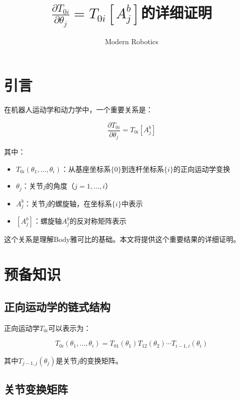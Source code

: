 \documentclass[12pt,a4paper]{article}
\title{$\frac{\partial T_{0i}}{\partial \theta_j} = T_{0i} [A_j^b]$的详细证明}
\author{Modern Robotics}
\date{}
\begin{document}
\maketitle

\tableofcontents
\newpage

\section{引言}

在机器人运动学和动力学中，一个重要关系是：

\begin{equation}
\frac{\partial T_{0i}}{\partial \theta_j} = T_{0i} [A_j^b]
\label{eq:main_relation}
\end{equation}

其中：
\begin{itemize}
\item $T_{0i}(\theta_1, \ldots, \theta_i)$：从基座坐标系$\{0\}$到连杆坐标系$\{i\}$的正向运动学变换
\item $\theta_j$：关节$j$的角度（$j = 1, \ldots, i$）
\item $A_j^b$：关节$j$的螺旋轴，在坐标系$\{i\}$中表示
\item $[A_j^b]$：螺旋轴$A_j^b$的反对称矩阵表示
\end{itemize}

这个关系是理解Body雅可比的基础。本文将提供这个重要结果的详细证明。

\section{预备知识}

\subsection{正向运动学的链式结构}

正向运动学$T_{0i}$可以表示为：

\begin{equation}
T_{0i}(\theta_1, \ldots, \theta_i) = T_{01}(\theta_1) T_{12}(\theta_2) \cdots T_{i-1,i}(\theta_i)
\label{eq:forward_kinematics_chain}
\end{equation}

其中$T_{j-1,j}(\theta_j)$是关节$j$的变换矩阵。

\subsection{关节变换矩阵}
\end{document}
